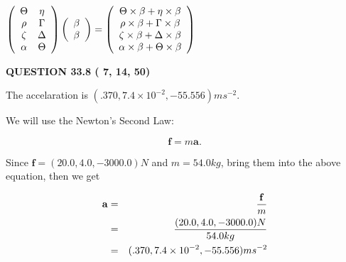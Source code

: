 \documentclass[12pt]{article}
\begin{document}
$  %
 \left( \begin{array}
 {
 c
 c
 }
 \Theta & 
 \eta \\ 
 \rho & 
 \Gamma \\ 
                    \zeta & 
 \Delta \\ 
 \alpha & 
 \Theta
 \end{array} \right)
 \left( \begin{array}
 {
 c
 }
 \beta \\ 
 \beta
 \end{array} \right)
=
  \left( \begin{array}
 {
 c
 }
 \Theta \times  \beta   +  \eta \times  \beta \\ 
 \rho \times  \beta   +  \Gamma \times  \beta \\ 
                    \zeta \times  \beta   +  \Delta \times  \beta \\ 
 \alpha \times  \beta   +  \Theta \times  \beta
 \end{array} \right)
$
 
 
 
 
 
\noindent{}

 
 
  
\vspace{0.2in}
  
{\textbf{\Large{QUESTION
33.8 
 (          7,         14,         50)
}}}
  
  
 
 
\noindent{}
 
 
  The accelaration is $  %
(
.370,
7.4 \times 10^{-2},
-55.556)
ms^{-2} $.
 
 
 
 
 
 
\noindent{}

We will use the Newton's Second Law:
 
\[
\mathbf{f}=m\mathbf{a}.
\]
 
Since $\mathbf{f}= %
(20.0 , 4.0 , -3000.0) N$
and $m= %
54.0kg$, bring them into the above equation, then we get
 
\begin{eqnarray*}
\mathbf{a}&=&\frac{\mathbf{f}}m  \\
&=&\frac{ %
(20.0 , 4.0 , -3000.0) N}{ %
54.0kg}  \\
&=& %
(.370 , 7.4 \times 10^{-2} , -55.556) ms^{-2}
\end{eqnarray*}
 
\end{document}

